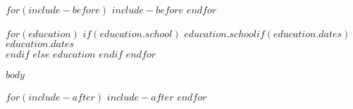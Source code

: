 \documentclass{resume}
\begin{document}
$for(include-before)$
$include-before$
$endfor$

$for(education)$
$if(education.school)$
$education.school$$if(education.dates)$ \hfill $education.dates$ \\$endif$
$else$
$education$
$endif$
$endfor$

$body$

$for(include-after)$
$include-after$
$endfor$
\end{document}
